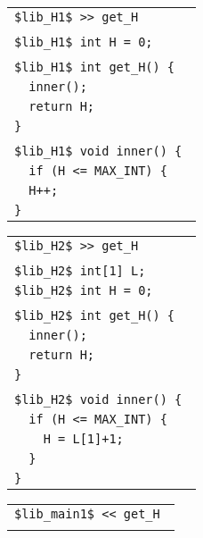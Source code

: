 \documentclass{article}
\begin{document}
\begin{figure}
  \begin{subfigure}{0.33\textwidth}
    \colorbox{gray!10}{
      \begin{tabular}{l}
        \tt \$lib\_H1\$ >> get\_H \\ \\

        \tt \$lib\_H1\$ int H = 0; \\ \\

        \tt \$lib\_H1\$ int get\_H() \{ \\
        \tt ~ inner(); \\
        \tt ~ return H; \\
        \tt \} \\ \\

        \tt \$lib\_H1\$ void inner() \{ \\
        \tt ~ if (H <= MAX\_INT) \{ \\
        \tt ~ H++; \\
        \tt \} \\
      \end{tabular}
    }
  \end{subfigure}
  \begin{subfigure}{0.33\textwidth}
    \colorbox{gray!20}{
      \begin{tabular}{l}
        \tt \$lib\_H2\$ >> get\_H \\ \\
        \tt \$lib\_H2\$ int[1] L; \\
        \tt \$lib\_H2\$ int H = 0; \\ \\
        
        \tt \$lib\_H2\$ int get\_H() \{ \\
        \tt ~ inner(); \\
        \tt ~ return H; \\
        \tt \} \\ \\
        
        \tt \$lib\_H2\$ void inner() \{ \\
        \tt ~ if (H <= MAX\_INT) \{ \\
        \tt ~ ~ H = L[1]+1; \\
        \tt ~ \} \\
        \tt \} \\
      \end{tabular}
    }
  \end{subfigure}
  \begin{subfigure}{0.33\textwidth}
    \colorbox{gray!30}{
      \begin{tabular}{l}
        \tt \$lib\_main1\$ << get\_H \\ \\


\end{tabular}}
\end{subfigure}
\end{figure}
\end{document}
